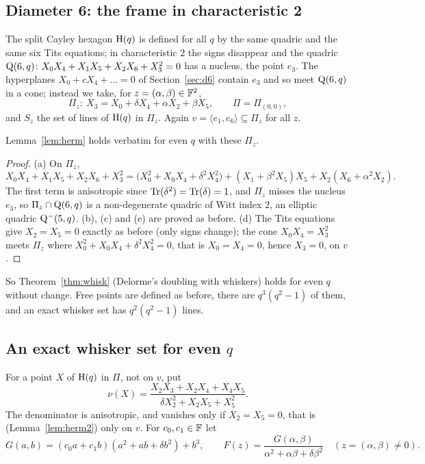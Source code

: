 \subsection{Diameter 6: the frame in characteristic 2}
The split Cayley hexagon $\mathrm{H}(q)$ is defined for all $q$ by the same quadric and the same six Tits equations; in characteristic $2$ the signs disappear and the quadric $\mathrm{Q}(6,q)\colon X_0X_4+X_1X_5+X_2X_6+X_3^2=0$ has a nucleus, the point $e_3$. The hyperplanes $X_0+cX_4+\dots=0$ of Section~\ref{sec:d6} contain $e_3$ and so meet $\mathrm{Q}(6,q)$ in a cone; instead we take, for $z=(\alpha,\beta)\in\mathbb{F}^2$,
\[
\Pi_z\colon\ X_3=X_0+\delta X_4+\alpha X_2+\beta X_5,\qquad \Pi=\Pi_{(0,0)},
\]
and $S_z$ the set of lines of $\mathrm{H}(q)$ in $\Pi_z$. Again $v=\langle e_1,e_6\rangle\subseteq\Pi_z$ for all $z$.

\begin{lemma}\label{lem:herm2}
Lemma~\ref{lem:herm} holds verbatim for even $q$ with these $\Pi_z$.
\end{lemma}

\begin{proof}
(a) On $\Pi_z$,
\[
X_0X_4+X_1X_5+X_2X_6+X_3^2=\bigl(X_0^2+X_0X_4+\delta^2X_4^2\bigr)+(X_1+\beta^2X_5)X_5+X_2(X_6+\alpha^2X_2).
\]
The first term is anisotropic since $\mathrm{Tr}(\delta^2)=\mathrm{Tr}(\delta)=1$, and $\Pi_z$ misses the nucleus $e_3$, so $\Pi_z\cap\mathrm{Q}(6,q)$ is a non-degenerate quadric of Witt index $2$, an elliptic quadric $\mathrm{Q}^-(5,q)$. (b), (c) and (e) are proved as before. (d) The Tits equations give $X_2=X_5=0$ exactly as before (only signs change); the cone $X_0X_4=X_3^2$ meets $\Pi_z$ where $X_0^2+X_0X_4+\delta^2X_4^2=0$, that is $X_0=X_4=0$, hence $X_3=0$, on $v$.
\end{proof}

So Theorem~\ref{thm:whisk} (Delorme's doubling with whiskers) holds for even $q$ without change. Free points are defined as before, there are $q^3(q^2-1)$ of them, and an exact whisker set has $q^2(q^2-1)$ lines.

\subsection{An exact whisker set for even \texorpdfstring{$q$}{q}}
For a point $X$ of $\mathrm{H}(q)$ in $\Pi$, not on $v$, put
\[
\nu(X)=\frac{X_2X_3+X_2X_4+X_4X_5}{\delta X_2^2+X_2X_5+X_5^2}.
\]
The denominator is anisotropic, and vanishes only if $X_2=X_5=0$, that is (Lemma~\ref{lem:herm2}) only on $v$. For $c_0,c_1\in\mathbb{F}$ let
\[
G(a,b)=(c_0a+c_1b)(a^2+ab+\delta b^2)+b^3,\qquad F(z)=\frac{G(\alpha,\beta)}{\alpha^2+\alpha\beta+\delta\beta^2}\quad(z=(\alpha,\beta)\ne0).
\]

